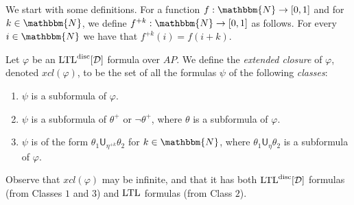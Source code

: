 \documentclass{llncs}
\newcommand{\Nat}{\mathbbm{N}}
\newcommand{\LTL}{{\ensuremath{\rm LTL}}\xspace}
\newcommand{\Until}{\mathsf{U}}
\newcommand{\D}{{\cal D}}
\renewcommand{\phi}{\varphi}
\newcommand{\DLTL}{\ensuremath{\LTL^{\text{disc}}[\D]}}
\newcommand{\df}{\eta}
\newcommand{\pos}[1]{{#1}^{+}}
\begin{document}
We start with some definitions. For a function $f:\Nat\to [0,1]$ and for $k\in \Nat$, we define $f^{+k}:\Nat\to [0,1]$ as follows. For every $i\in \Nat$ we have that $f^{+k}(i)=f(i+k)$. 

Let $\phi$ be an $\DLTL$ formula over $AP$.
We define the {\em extended closure} of $\phi$, denoted $xcl(\phi)$, to be the set of all the formulas $\psi$ of the following {\em classes}:
\begin{enumerate}
\item $\psi$ is a subformula of $\phi$.
\item $\psi$ is a subformula of $\pos{\theta}$ or $\pos{\neg \theta}$, where $\theta$ is a subformula of $\phi$. 
\item $\psi$ is of the form $\theta_1\Until_{\df^{+k}} \theta_2$ for $k\in \Nat$, where $\theta_1\Until_{\df}\theta_2$ is a subformula of $\phi$.
\end{enumerate}
Observe that $xcl(\phi)$ may be infinite, and that it has both $\DLTL$ formulas (from Classes $1$ and $3$) and $\LTL$ formulas (from Class $2$).
\end{document}
